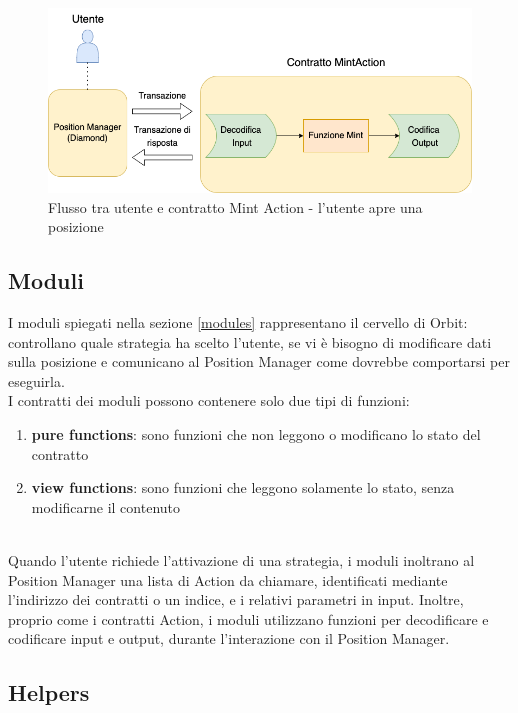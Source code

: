 \documentclass[12pt,a4paper]{report}
\begin{document}
\begin{figure}[H]
  \includegraphics[scale=0.50]{mint_action.png}
  \centering
  \caption{Flusso tra utente e contratto Mint Action - l'utente apre una posizione}
  \label{fig:mint_action}
\end{figure}



\subsection{Moduli}

I moduli spiegati nella sezione \ref{modules} rappresentano il cervello di Orbit: controllano quale strategia ha scelto l'utente, se vi è bisogno di modificare dati sulla posizione e comunicano al Position Manager come dovrebbe comportarsi per eseguirla.
\\I contratti dei moduli possono contenere solo due tipi di funzioni:
\\
\begin{enumerate}
    \item \textbf{pure functions}: sono funzioni che non leggono o modificano lo stato del contratto
    \item \textbf{view functions}: sono funzioni che leggono solamente lo stato, senza modificarne il contenuto
\end{enumerate}

\noindent\\Quando l'utente richiede l'attivazione di una strategia, i moduli inoltrano al Position Manager una lista di Action da chiamare, identificati mediante l'indirizzo dei contratti o un indice, e i relativi parametri in input. Inoltre, proprio come i contratti Action, i moduli utilizzano funzioni per decodificare e codificare input e output, durante l'interazione con il Position Manager.


\subsection{Helpers}
\end{document}
